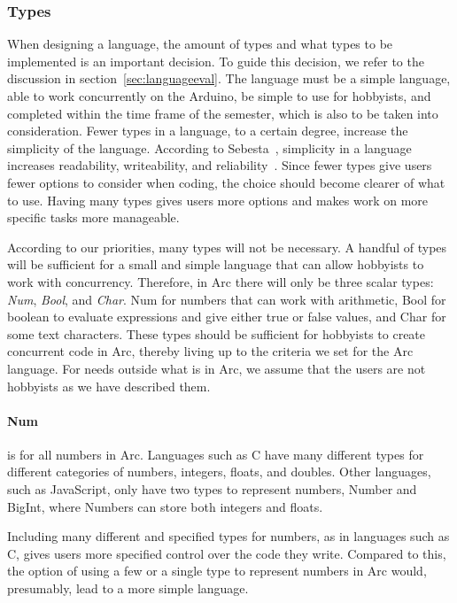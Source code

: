 \subsubsection{Types}\label{subsec:types}
When designing a language, the amount of types and what types to be implemented is an important decision. To guide this decision, we refer to the discussion in section~\ref{sec:languageeval}. The language must be a simple language, able to work concurrently on the Arduino, be simple to use for hobbyists, and completed within the time frame of the semester, which is also to be taken into consideration. Fewer types in a language, to a certain degree, increase the simplicity of the language. According to Sebesta~\cite{Sebesta2016}, simplicity in a language increases readability, writeability, and reliability~\cite{Sebesta2016}. Since fewer types give users fewer options to consider when coding, the choice should become clearer of what to use. Having many types gives users more options and makes work on more specific tasks more manageable.

According to our priorities, many types will not be necessary. A handful of types will be sufficient for a small and simple language that can allow hobbyists to work with concurrency. Therefore, in Arc there will only be three scalar types: \textit{Num}, \textit{Bool}, and \textit{Char}. Num for numbers that can work with arithmetic, Bool for boolean to evaluate expressions and give either true or false values, and Char for some text characters. These types should be sufficient for hobbyists to create concurrent code in Arc, thereby living up to the criteria we set for the Arc language. For needs outside what is in Arc, we assume that the users are not hobbyists as we have described them.


\paragraph{Num} is for all numbers in Arc. Languages such as C have many different types for different categories of numbers, integers, floats, and doubles. Other languages, such as JavaScript, only have two types to represent numbers, Number and BigInt, where Numbers can store both integers and floats.

Including many different and specified types for numbers, as in languages such as C, gives users more specified control over the code they write. Compared to this, the option of using a few or a single type to represent numbers in Arc would, presumably, lead to a more simple language.

